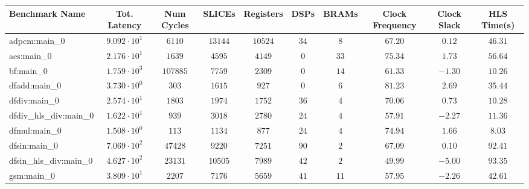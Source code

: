 \begin{tabular}{|l|c|c|c|c|c|c|c|c|c|}
\hline
Benchmark Name          & Tot. Latency           & Num Cycles & SLICEs    & Registers & DSPs    & BRAMs   & Clock Frequency & Clock Slack & HLS Time(s) \\
\hline
adpcm:main\_0           & $ 9.092 \cdot 10^{1} $ & $ 6110   $ & $ 13144 $ & $ 10524 $ & $ 34  $ & $ 8   $ & $ 67.20       $ & $ 0.12    $ & $ 46.31   $ \\
aes:main\_0             & $ 2.176 \cdot 10^{1} $ & $ 1639   $ & $ 4595  $ & $ 4149  $ & $ 0   $ & $ 33  $ & $ 75.34       $ & $ 1.73    $ & $ 56.64   $ \\
bf:main\_0              & $ 1.759 \cdot 10^{3} $ & $ 107885 $ & $ 7759  $ & $ 2309  $ & $ 0   $ & $ 14  $ & $ 61.33       $ & $ -1.30   $ & $ 10.26   $ \\
dfadd:main\_0           & $ 3.730 \cdot 10^{0} $ & $ 303    $ & $ 1615  $ & $ 927   $ & $ 0   $ & $ 6   $ & $ 81.23       $ & $ 2.69    $ & $ 35.44   $ \\
dfdiv:main\_0           & $ 2.574 \cdot 10^{1} $ & $ 1803   $ & $ 1974  $ & $ 1752  $ & $ 36  $ & $ 4   $ & $ 70.06       $ & $ 0.73    $ & $ 10.28   $ \\
dfdiv\_hls\_div:main\_0 & $ 1.622 \cdot 10^{1} $ & $ 939    $ & $ 3018  $ & $ 2780  $ & $ 24  $ & $ 4   $ & $ 57.91       $ & $ -2.27   $ & $ 11.36   $ \\
dfmul:main\_0           & $ 1.508 \cdot 10^{0} $ & $ 113    $ & $ 1134  $ & $ 877   $ & $ 24  $ & $ 4   $ & $ 74.94       $ & $ 1.66    $ & $ 8.03    $ \\
dfsin:main\_0           & $ 7.069 \cdot 10^{2} $ & $ 47428  $ & $ 9220  $ & $ 7251  $ & $ 90  $ & $ 2   $ & $ 67.09       $ & $ 0.10    $ & $ 92.41   $ \\
dfsin\_hls\_div:main\_0 & $ 4.627 \cdot 10^{2} $ & $ 23131  $ & $ 10505 $ & $ 7989  $ & $ 42  $ & $ 2   $ & $ 49.99       $ & $ -5.00   $ & $ 93.35   $ \\
gsm:main\_0             & $ 3.809 \cdot 10^{1} $ & $ 2207   $ & $ 7176  $ & $ 5659  $ & $ 41  $ & $ 11  $ & $ 57.95       $ & $ -2.26   $ & $ 42.61   $ \\

\end{tabular}
